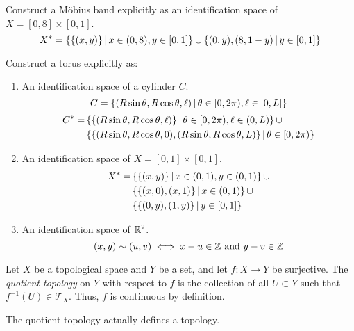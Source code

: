 \documentclass[letterpaper,12pt,fleqn]{article}
\newcommand{\T}{\mathscr{T}}
\renewcommand{\O}{\theta}
\begin{document}
\begin{example}
  Construct a M\"{o}bius band explicitly as an identification space of \(X=[0,8]\times[0,1]\).
  \[X^*=\left\{{\{(x,y)\}}\,\middle|\,{x\in(0,8),y\in[0,1]}\right\}\cup\left\{{{(0,y),(8,1-y)}}\,\middle|\,{y\in[0,1]}\right\}\]
\end{example}

\begin{example}[Torus]
  Construct a torus explicitly as:
  \begin{enumerate}
  \item An identification space of a cylinder \(C\).
    \[C=\setb{(R\sin\O,R\cos\O,\ell)}{\O\in[0,2\pi),\ell\in[0,L]}\]
    \begin{align*}
      C^* =& \setb{\set{(R\sin\O,R\cos\O,\ell)}}{\O\in[0,2\pi),\ell\in(0,L)}\cup \\
      & \setb{\set{(R\sin\O,R\cos\O,0),(R\sin\O,R\cos\O,L)}}{\O\in[0,2\pi)}
    \end{align*}
  \item An identification space of \(X=[0,1]\times[0,1]\).
    \begin{align*}
      X^* =& \left\{{\{(x,y)\}}\,\middle|\,{x\in(0,1),y\in(0,1)}\right\}\cup \\
      & \left\{{\{(x,0),(x,1)\}}\,\middle|\,{x\in(0,1)}\right\}\cup \\
      & \left\{{\{(0,y),(1,y)\}}\,\middle|\,{y\in[0,1]}\right\}
    \end{align*}
  \item An identification space of \(\mathbb{R}^2\).
    \[(x,y)\sim(u,v)\iff x-u\in\Z\ \text{and}\ y-v\in\Z\]
  \end{enumerate}
\end{example}

\begin{definition}
  Let \(X\) be a topological space and \(Y\) be a set, and let \(f:X\to Y\) be surjective.  The
  \emph{quotient topology} on \(Y\) with respect to \(f\) is the collection of all \(U\subset Y\) such that
  \(f^{-1}(U)\in\T_X\).  Thus, \(f\) is continuous by definition.
\end{definition}

\begin{theorem}
  The quotient topology actually defines a topology.
\end{theorem}
\end{document}
